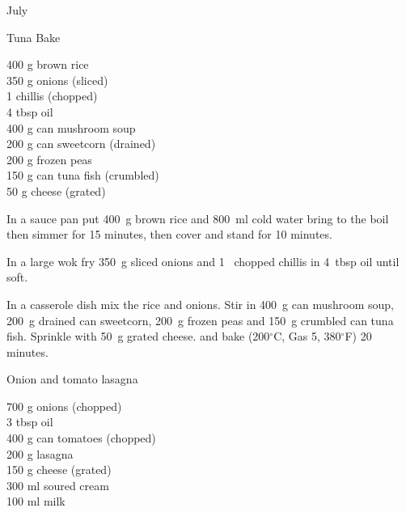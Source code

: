 \begin{menu}{July}
\begin{recipe}{2}{Tuna Bake}
		\begin{ingredients}
		400 g brown rice  \\
	350 g onions (sliced) \\
	1  chillis (chopped) \\
	4 tbsp oil  \\
	400 g can mushroom soup  \\
	200 g can sweetcorn (drained) \\
	200 g frozen peas  \\
	150 g can tuna fish (crumbled) \\
	50 g cheese (grated) \\
	
		\end{ingredients}
	
    \begin{instructions}
    \item 
      In a
      sauce pan
      put
      400~g  brown rice
      and
      800~ml  cold water
      bring to the boil then simmer for 15 minutes,
      then cover and stand for 10 minutes.
    \item 
        In a large wok fry
        350~g sliced onions
        and
        1~ chopped chillis
        in
        4~tbsp  oil
        until soft.
      \item 
        In a casserole dish mix
        the rice and onions.
        Stir in
        400~g  can mushroom soup,
        200~g drained can sweetcorn,
        200~g  frozen peas
        and
        150~g crumbled can tuna fish.
        Sprinkle with
        50~g grated cheese.
        and
        bake 
      (200$^{\circ}$C, Gas 5, 380$^{\circ}$F)
     20 minutes.
      
    \end{instructions}
    \end{recipe}%
  
    \begin{recipe}{2}{Onion and tomato lasagna}%
    
		\begin{ingredients}
		700 g onions (chopped) \\
	3 tbsp oil  \\
	400 g can tomatoes (chopped) \\
	200 g lasagna  \\
	150 g cheese (grated) \\
	300 ml soured cream  \\
	100 ml milk  \\
	

\end{ingredients}
\end{recipe}
\end{menu}
